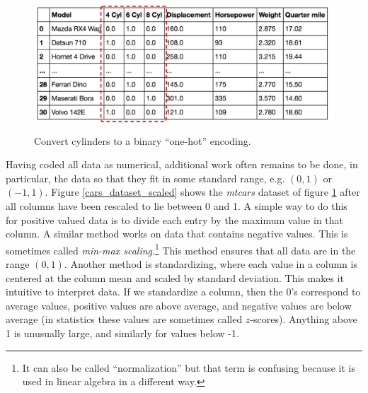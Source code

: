 
\begin{figure}[h]
\centering
\includegraphics[height=50mm]{./images/CarsOneHot.png}
\caption[Screenshot of the Motor Trend Car Road Tests dataset included in R.]{Convert cylinders to a binary ``one-hot'' encoding.}
\label{cars_onehot}
\end{figure}

Having coded all data as numerical, additional work often remains to be done, in particular,  the data so that they fit in some standard range, e.g. $(0,1)$ or $(-1,1)$. Figure \ref{cars_dataset_scaled} shows the \emph{mtcars} dataset of figure \ref{cars_onehot} after all columns have been rescaled to lie between 0 and 1. A simple way to do this for positive valued data is to divide each entry by the maximum value in that column. A similar method works on data that contains negative values. This is sometimes called \emph{min-max scaling}.\footnote{It can also be called ``normalization'' but that term is confusing because it is used in linear algebra in a  different way.} This method ensures that all data are in the range  $(0,1)$. Another method is standardizing, where each value in a column is centered at the column mean and scaled by standard deviation. This makes it intuitive to interpret data. If we standardize a column, then the 0's correspond to average values, positive values are above average, and negative values are below average (in statistics these values are sometimes called $z$-scores). Anything above 1 is unusually large, and similarly for values below -1. 

